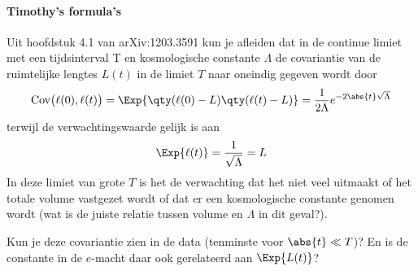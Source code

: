 \paragraph{Timothy's formula's}
Uit hoofdstuk 4.1 van arXiv:1203.3591 kun je afleiden dat in de continue
limiet met een tijdsinterval T en kosmologische constante $\Lambda$ de
covariantie van de ruimtelijke lengtes $L(t)$ in de limiet $T$ naar oneindig gegeven wordt door
\begin{equation}
    \text{Cov}\big(\ell(0), \ell(t)\big) = \Exp{\qty(\ell(0) - L)\qty(\ell(t) - L)}
    = \frac{1}{2\Lambda} e^{- 2\abs{t}\sqrt{\Lambda}}
\end{equation}
terwijl de verwachtingswaarde gelijk is aan
\begin{equation}
    \Exp{\ell(t)} = \frac{1}{\sqrt{\Lambda}} = L
\end{equation}
In deze limiet van grote $T$ is het de verwachting dat het niet veel
uitmaakt of het totale volume vastgezet wordt of dat er een
kosmologische constante genomen wordt (wat is de juiste relatie tussen
volume en $\Lambda$ in dit geval?).

Kun je deze covariantie zien in de data (tenminste voor $\abs{t} \ll T$)? En is
de constante in de $e$-macht daar ook gerelateerd aan $\Exp{L(t)}$?